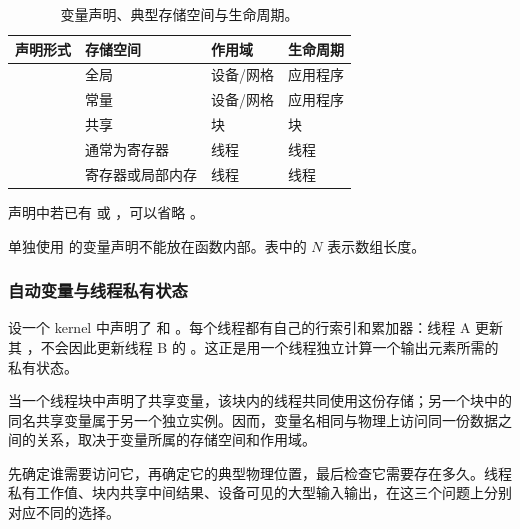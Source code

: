 \begin{table}[H]
\centering\small
\caption{变量声明、典型存储空间与生命周期。}
\begin{tabularx}{\textwidth}{L{0.43\textwidth} L{0.19\textwidth} L{0.12\textwidth} Y}
\toprule
声明形式 & 存储空间 & 作用域 & 生命周期 \\
\midrule
{} & 全局 & 设备/网格 & 应用程序 \\
 & 常量 & 设备/网格 & 应用程序 \\
 & 共享 & 块 & 块 \\
 & 通常为寄存器 & 线程 & 线程 \\
 & 寄存器或局部内存 & 线程 & 线程 \\
\bottomrule
\end{tabularx}
\end{table}
声明中若已有 \mbox{} 或 \mbox{}，可以省略 \mbox{}。

单独使用 \mbox{} 的变量声明不能放在函数内部。表中的 $N$ 表示数组长度。

\subsubsection{自动变量与线程私有状态}
设一个 kernel 中声明了  和 。每个线程都有自己的行索引和累加器：线程 A 更新其 ，不会因此更新线程 B 的 。这正是用一个线程独立计算一个输出元素所需的私有状态。

当一个线程块中声明了共享变量，该块内的线程共同使用这份存储；另一个块中的同名共享变量属于另一个独立实例。因而，变量名相同与物理上访问同一份数据之间的关系，取决于变量所属的存储空间和作用域。

\begin{keybox}[title={判断变量的三个问题}]
先确定谁需要访问它，再确定它的典型物理位置，最后检查它需要存在多久。线程私有工作值、块内共享中间结果、设备可见的大型输入输出，在这三个问题上分别对应不同的选择。
\end{keybox}
